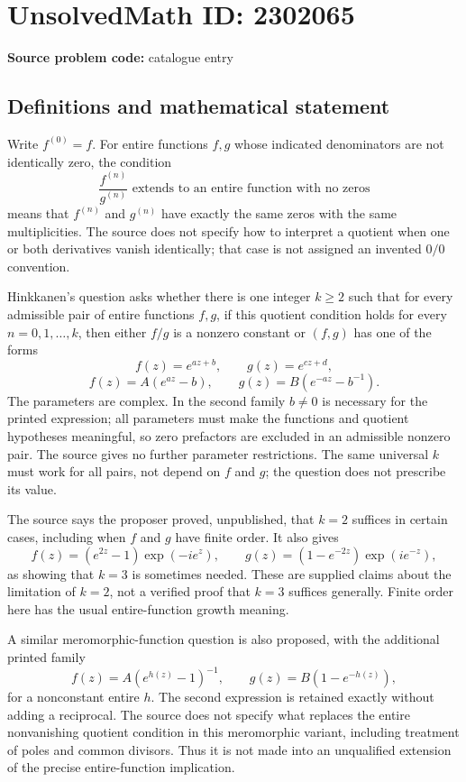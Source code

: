 \documentclass[11pt]{article}
\begin{document}
\section*{UnsolvedMath ID: 2302065}
\textbf{Source problem code:} catalogue entry
\subsection{Definitions and mathematical statement}
Write $f^{(0)}=f$. For entire functions $f,g$ whose indicated denominators are not identically zero, the condition
\[
\frac{f^{(n)}}{g^{(n)}}\text{ extends to an entire function with no zeros}
\]
means that $f^{(n)}$ and $g^{(n)}$ have exactly the same zeros with the same multiplicities. The source does not specify how to interpret a quotient when one or both derivatives vanish identically; that case is not assigned an invented $0/0$ convention.

Hinkkanen's question asks whether there is one integer $k\ge2$ such that for every admissible pair of entire functions $f,g$, if this quotient condition holds for every $n=0,1,\ldots,k$, then either $f/g$ is a nonzero constant or $(f,g)$ has one of the forms
\[
f(z)=e^{az+b},\qquad g(z)=e^{cz+d},
\]
\[
f(z)=A(e^{az}-b),\qquad g(z)=B(e^{-az}-b^{-1}).
\]
The parameters are complex. In the second family $b\ne0$ is necessary for the printed expression; all parameters must make the functions and quotient hypotheses meaningful, so zero prefactors are excluded in an admissible nonzero pair. The source gives no further parameter restrictions. The same universal $k$ must work for all pairs, not depend on $f$ and $g$; the question does not prescribe its value.

The source says the proposer proved, unpublished, that $k=2$ suffices in certain cases, including when $f$ and $g$ have finite order. It also gives
\[
f(z)=(e^{2z}-1)\exp(-i e^z),\qquad
g(z)=(1-e^{-2z})\exp(i e^{-z}),
\]
as showing that $k=3$ is sometimes needed. These are supplied claims about the limitation of $k=2$, not a verified proof that $k=3$ suffices generally. Finite order here has the usual entire-function growth meaning.

A similar meromorphic-function question is also proposed, with the additional printed family
\[
f(z)=A(e^{h(z)}-1)^{-1},\qquad
g(z)=B(1-e^{-h(z)}),
\]
for a nonconstant entire $h$. The second expression is retained exactly without adding a reciprocal. The source does not specify what replaces the entire nonvanishing quotient condition in this meromorphic variant, including treatment of poles and common divisors. Thus it is not made into an unqualified extension of the precise entire-function implication.
\end{document}
